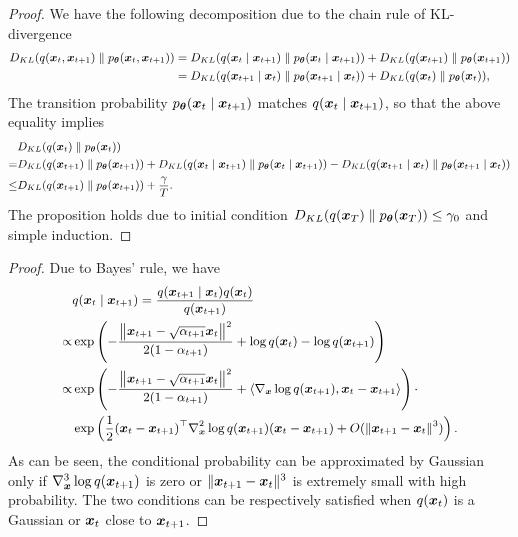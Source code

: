 \begin{proof}
We have the following decomposition due to the chain rule of KL-divergence
\begin{equation}\label{eq:decomp on kl}
    \small
    \begin{aligned}
        D_{KL}(q(\boldsymbol{x}_{t}, \boldsymbol{x}_{t + 1}) \parallel p_{\boldsymbol{\theta}}(\boldsymbol{x}_{t}, \boldsymbol{x}_{t + 1})) & = D_{KL}(q(\boldsymbol{x}_{t}\mid \boldsymbol{x}_{t + 1}) \parallel p_{\boldsymbol{\theta}}(\boldsymbol{x}_{t}\mid \boldsymbol{x}_{t + 1})) + D_{KL}(q(\boldsymbol{x}_{t+1})\parallel p_{\boldsymbol{\theta}}(\boldsymbol{x}_{t+1})) \\
        & = D_{KL}(q(\boldsymbol{x}_{t+1}\mid \boldsymbol{x}_{t}) \parallel p_{\boldsymbol{\theta}}(\boldsymbol{x}_{t+1}\mid \boldsymbol{x}_{t})) + D_{KL}(q(\boldsymbol{x}_{t})\parallel p_{\boldsymbol{\theta}}(\boldsymbol{x}_{t})),
    \end{aligned}
\end{equation}
The transition probability $p_{\boldsymbol{\theta}}(\boldsymbol{x}_{t}\mid \boldsymbol{x}_{t + 1})$ matches $q(\boldsymbol{x}_{t}\mid \boldsymbol{x}_{t + 1})$, so that the above equality implies 
\begin{equation}
\small
\begin{aligned}
    &D_{KL}(q(\boldsymbol{x}_{t})\parallel p_{\boldsymbol{\theta}}(\boldsymbol{x}_{t}))\\
    = &D_{KL}(q(\boldsymbol{x}_{t+1})\parallel p_{\boldsymbol{\theta}}(\boldsymbol{x}_{t+1})) + D_{KL}(q(\boldsymbol{x}_{t}\mid \boldsymbol{x}_{t + 1}) \parallel p_{\boldsymbol{\theta}}(\boldsymbol{x}_{t}\mid \boldsymbol{x}_{t + 1})) - D_{KL}(q(\boldsymbol{x}_{t+1}\mid \boldsymbol{x}_{t}) \parallel p_{\boldsymbol{\theta}}(\boldsymbol{x}_{t+1}\mid \boldsymbol{x}_{t}))\\
    \leq & D_{KL}(q(\boldsymbol{x}_{t+1})\parallel p_{\boldsymbol{\theta}}(\boldsymbol{x}_{t+1})) + \frac{\gamma}{T}.
\end{aligned}
\end{equation}
The proposition holds due to initial condition $D_{KL}(q(\boldsymbol{x}_{T})\parallel p_{\boldsymbol{\theta}}(\boldsymbol{x}_{T})) \le \gamma_0$ and simple induction.
\end{proof}

\gaussianinverse*
\begin{proof}
	Due to Bayes' rule, we have 
	\begin{equation}
		\small
		\begin{aligned}
			& q(\boldsymbol{x}_{t} \mid \boldsymbol{x}_{t + 1}) = \frac{q(\boldsymbol{x}_{t + 1} \mid \boldsymbol{x}_{t})q(\boldsymbol{x}_{t})}{q(\boldsymbol{x}_{t + 1})} \\
			\propto & \exp\left(-\frac{\left\|\boldsymbol{x}_{t + 1} - \sqrt{\alpha_{t + 1}}\boldsymbol{x}_{t}\right\|^{2}}{2(1 - \alpha_{t + 1})} + \log{q(\boldsymbol{x}_{t})} - \log{q(\boldsymbol{x}_{t + 1})}\right) \\
			\propto & \exp\left(-\frac{\left\|\boldsymbol{x}_{t + 1} - \sqrt{\alpha_{t + 1}}\boldsymbol{x}_{t}\right\|^{2}}{2(1 - \alpha_{t + 1})} + \left\langle\nabla_{\boldsymbol{x}}\log{q(\boldsymbol{x}_{t + 1})}, \boldsymbol{x}_{t} - \boldsymbol{x}_{t + 1}\right\rangle \right) \cdot  \\
            & \exp\left( \frac{1}{2}(\boldsymbol{x}_{t} - \boldsymbol{x}_{t + 1})^{\top}\nabla^{2}_{\boldsymbol{x}}\log{q(\boldsymbol{x}_{t + 1})}(\boldsymbol{x}_{t} - \boldsymbol{x}_{t + 1}) +  O(\|\boldsymbol{x}_{t + 1} - \boldsymbol{x}_{t}\|^{3})\right).
		\end{aligned}
	\end{equation}
	As can be seen, the conditional probability can be approximated by Gaussian only if $\nabla^{3}_{\boldsymbol{x}}\log{q(\boldsymbol{x}_{t+1})}$ is zero or $\|\boldsymbol{x}_{t + 1} - \boldsymbol{x}_{t}\|^{3}$ is extremely small with high probability. The two conditions can be respectively satisfied when $q(\boldsymbol{x}_{t})$ is a Gaussian or $\boldsymbol{x}_{t}$ close to $\boldsymbol{x}_{t+1}$. 
\end{proof}


